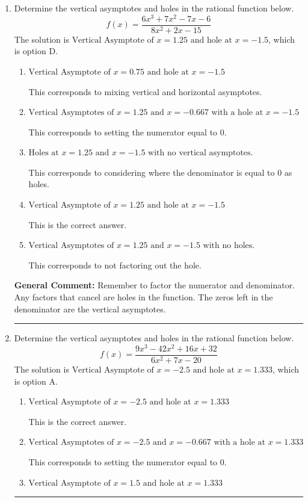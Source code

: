 \documentclass{extbook}[14pt]
\newcommand{\litem}[1]{\item #1

\rule{\textwidth}{0.4pt}}
\begin{document}
\begin{enumerate}\litem{
Determine the vertical asymptotes and holes in the rational function below.
\[ f(x) = \frac{6x^{3} +7 x^{2} -7 x -6}{8x^{2} +2 x -15} \]The solution is \( \text{Vertical Asymptote of } x = 1.25 \text{ and hole at } x = -1.5 \), which is option D.\begin{enumerate}[label=\Alph*.]
\item \( \text{Vertical Asymptote of } x = 0.75 \text{ and hole at } x = -1.5 \)

This corresponds to mixing vertical and horizontal asymptotes.
\item \( \text{Vertical Asymptotes of } x = 1.25 \text{ and } x = -0.667 \text{ with a hole at } x = -1.5 \)

This corresponds to setting the numerator equal to 0.
\item \( \text{Holes at } x = 1.25 \text{ and } x = -1.5 \text{ with no vertical asymptotes.} \)

This corresponds to considering where the denominator is equal to 0 as holes.
\item \( \text{Vertical Asymptote of } x = 1.25 \text{ and hole at } x = -1.5 \)

This is the correct answer.
\item \( \text{Vertical Asymptotes of } x = 1.25 \text{ and } x = -1.5 \text{ with no holes.} \)

This corresponds to not factoring out the hole.
\end{enumerate}

\textbf{General Comment:} Remember to factor the numerator and denominator. Any factors that cancel are holes in the function. The zeros left in the denominator are the vertical asymptotes.
}
\litem{
Determine the vertical asymptotes and holes in the rational function below.
\[ f(x) = \frac{9x^{3} -42 x^{2} +16 x + 32}{6x^{2} +7 x -20} \]The solution is \( \text{Vertical Asymptote of } x = -2.5 \text{ and hole at } x = 1.333 \), which is option A.\begin{enumerate}[label=\Alph*.]
\item \( \text{Vertical Asymptote of } x = -2.5 \text{ and hole at } x = 1.333 \)

This is the correct answer.
\item \( \text{Vertical Asymptotes of } x = -2.5 \text{ and } x = -0.667 \text{ with a hole at } x = 1.333 \)

This corresponds to setting the numerator equal to 0.
\item \( \text{Vertical Asymptote of } x = 1.5 \text{ and hole at } x = 1.333 \)


\end{enumerate}}
\end{enumerate}
\end{document}
